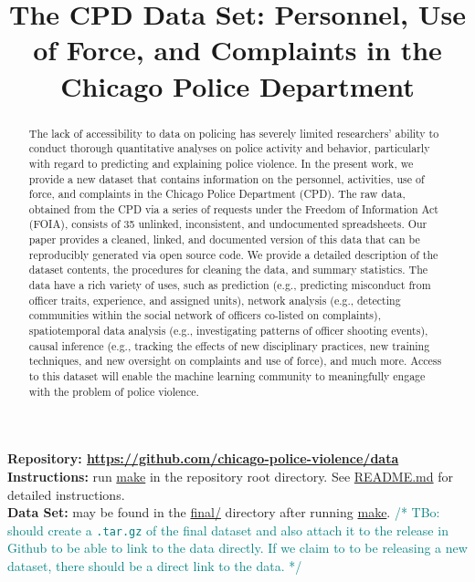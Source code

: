 \documentclass{article}
\title{The CPD Data Set: Personnel, Use of Force, and Complaints in the Chicago Police Department}
\newcommand{\tbo}[1]{\textcolor{teal}{/* TBo: #1 */}}
\begin{document}
\maketitle

\begin{abstract}
The lack of accessibility to data on policing has severely limited researchers’ ability to conduct thorough quantitative analyses on police activity and behavior, particularly with regard to predicting and explaining police violence. In the present work, we provide a new dataset that contains information on the personnel, activities, use of force, and complaints in the Chicago Police Department (CPD). The raw data, obtained from the CPD via a series of requests under the Freedom of Information Act (FOIA), consists of 35 unlinked, inconsistent, and undocumented spreadsheets. Our paper provides a cleaned, linked, and documented version of this data that can be reproducibly generated via open source code. We provide a detailed description of the dataset contents, the procedures for cleaning the data, and summary statistics. The data have a rich variety of uses, such as prediction (e.g., predicting misconduct from officer traits, experience, and assigned units), network analysis (e.g., detecting communities within the social network of officers co-listed on complaints), spatiotemporal data analysis (e.g., investigating patterns of officer shooting events), causal inference (e.g., tracking the effects of new disciplinary practices, new training techniques, and new oversight on complaints and use of force), and much more. Access to this dataset will enable the machine learning community to meaningfully engage with the problem of police violence.
\end{abstract}

\textbf{Repository: \url{https://github.com/chicago-police-violence/data}}\\
\textbf{Instructions:} run \url{make} in the repository root directory. See \url{README.md} for detailed instructions.\\
\textbf{Data Set:} may be found in the \url{final/} directory after running \url{make}.
\tbo{should create a \texttt{.tar.gz} of the final dataset and also attach it
to the release in Github to be able to link to the data directly. If we claim
to to be releasing a new dataset, there should be a direct link to the data.}















\appendix






\end{document}

